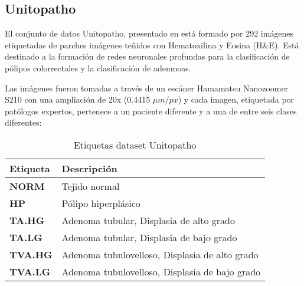 \subsection{Unitopatho}

El conjunto de datos Unitopatho, presentado en \cite{Barbano_2021} está formado por 292 imágenes etiquetadas de parches imágenes teñidos con Hematoxilina y Eosina (H\&E). Está destinado a la formación de redes neuronales profundas para la clasificación de pólipos colorrectales y la clasificación de adenmoas.

Las imágenes fueron tomadas a través de un escáner Hamamatsu Nanozoomer S210 con una ampliación de 20x (0.4415 $\mu m/px$) y cada imagen, etiquetada por patólogos expertos, pertenece a un paciente diferente y a una de entre seis clases diferentes:

\begin{table}[!ht]
    \centering
    \begin{tabular}{|l|l|}
    \hline
        \textbf{Etiqueta} & \textbf{Descripción} \\ \hline
        \textbf{NORM} & Tejido normal \\ \hline
        \textbf{HP} & Pólipo hiperplásico \\ \hline
        \textbf{TA.HG} & Adenoma tubular, Displasia de alto grado \\ \hline
        \textbf{TA.LG} & Adenoma tubular, Displasia de bajo grado \\ \hline
        \textbf{TVA.HG} & Adenoma tubulovelloso, Displasia de alto grado \\ \hline
        \textbf{TVA.LG} & Adenoma tubulovelloso, Displasia de bajo grado \\ \hline
    \end{tabular}
    \caption{Etiquetas dataset Unitopatho}
    \label{tab:Unitopatho_labels}
\end{table}


